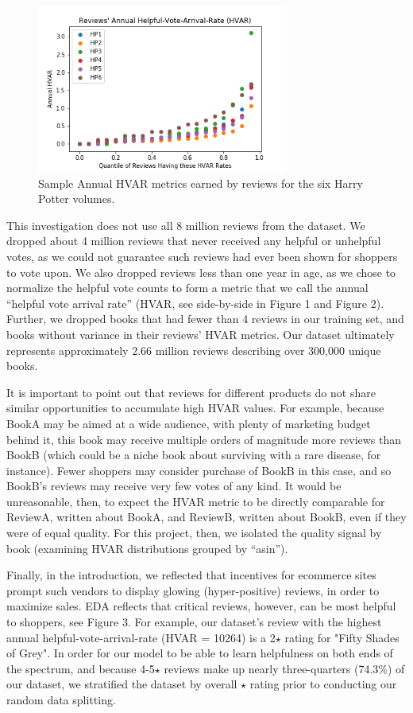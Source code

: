 \documentclass[10pt, a4paper, twocolumn]{article}
\begin{document}
\begin{figure}[ht]
\includegraphics[width=3.25in]{HP_reviews_annual_HVAR.png}
\caption{Sample Annual HVAR metrics earned by reviews for the six Harry Potter volumes.}
\end{figure}

This investigation does not use all 8 million reviews from the dataset. We dropped about 4 million reviews that never received any helpful or unhelpful votes, as we could not guarantee such reviews had ever been shown for shoppers to vote upon. We also dropped reviews less than one year in age, as we chose to normalize the helpful vote counts to form a metric that we call the annual “helpful vote arrival rate” (HVAR, see side-by-side in Figure 1 and Figure 2). Further, we dropped books that had fewer than 4 reviews in our training set, and books without variance in their reviews’ HVAR metrics. Our dataset ultimately represents approximately 2.66 million reviews describing over 300,000 unique books.


It is important to point out that reviews for different products do not share similar opportunities to accumulate high HVAR values. For example, because BookA may be aimed at a wide audience, with plenty of marketing budget behind it, this book may receive multiple orders of magnitude more reviews than BookB (which could be a niche book about surviving with a rare disease, for instance). Fewer shoppers may consider purchase of BookB in this case, and so BookB’s reviews may receive very few votes of any kind. It would be unreasonable, then, to expect the HVAR metric to be directly comparable for ReviewA, written about BookA, and ReviewB, written about BookB, even if they were of equal quality. For this project, then, we isolated the quality signal by book (examining HVAR distributions grouped by “asin”).

Finally, in the introduction, we reflected that incentives for ecommerce sites prompt such vendors to display glowing (hyper-positive) reviews, in order to maximize sales. EDA reflects that critical reviews, however, can be most helpful to shoppers, see Figure 3. For example, our dataset’s review with the highest annual helpful-vote-arrival-rate (HVAR = 10264) is a 2$\star$ rating for "Fifty Shades of Grey". In order for our model to be able to learn helpfulness on both ends of the spectrum, and because 4-5$\star$ reviews make up nearly three-quarters (74.3\%) of our dataset, we stratified the dataset by overall $\star$ rating prior to conducting our random data splitting.
\end{document}
